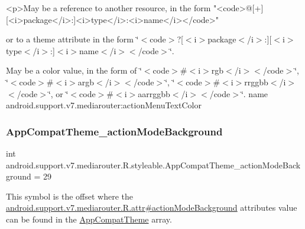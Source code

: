 \begin{DoxyVerb}      <p>May be a reference to another resource, in the form "<code>@[+][<i>package</i>:]<i>type</i>:<i>name</i></code>"
\end{DoxyVerb}
 or to a theme attribute in the form \char`\"{}$<$code$>$?\mbox{[}$<$i$>$package$<$/i$>$\+:\mbox{]}\mbox{[}$<$i$>$type$<$/i$>$\+:\mbox{]}$<$i$>$name$<$/i$>$$<$/code$>$\char`\"{}. 

May be a color value, in the form of \char`\"{}$<$code$>$\#$<$i$>$rgb$<$/i$>$$<$/code$>$\char`\"{}, \char`\"{}$<$code$>$\#$<$i$>$argb$<$/i$>$$<$/code$>$\char`\"{}, \char`\"{}$<$code$>$\#$<$i$>$rrggbb$<$/i$>$$<$/code$>$\char`\"{}, or \char`\"{}$<$code$>$\#$<$i$>$aarrggbb$<$/i$>$$<$/code$>$\char`\"{}.  name android.\+support.\+v7.\+mediarouter\+:action\+Menu\+Text\+Color \mbox{\label{classandroid_1_1support_1_1v7_1_1mediarouter_1_1R_1_1styleable_a80d019b16ff72b30687fa1c88b005f79}} 
\subsubsection{\texorpdfstring{App\+Compat\+Theme\+\_\+action\+Mode\+Background}{AppCompatTheme\_actionModeBackground}}
{\footnotesize\ttfamily int android.\+support.\+v7.\+mediarouter.\+R.\+styleable.\+App\+Compat\+Theme\+\_\+action\+Mode\+Background = 29\hspace{0.3cm}{\ttfamily [static]}}

This symbol is the offset where the \hyperlink{classandroid_1_1support_1_1v7_1_1mediarouter_1_1R_1_1attr_a61877989268b116a2bea6fbb830609bc}{android.\+support.\+v7.\+mediarouter.\+R.\+attr\#action\+Mode\+Background} attribute\textquotesingle{}s value can be found in the \hyperlink{classandroid_1_1support_1_1v7_1_1mediarouter_1_1R_1_1styleable_a4e3d3900c75d49aeb2f283cac00214d6}{App\+Compat\+Theme} array.

